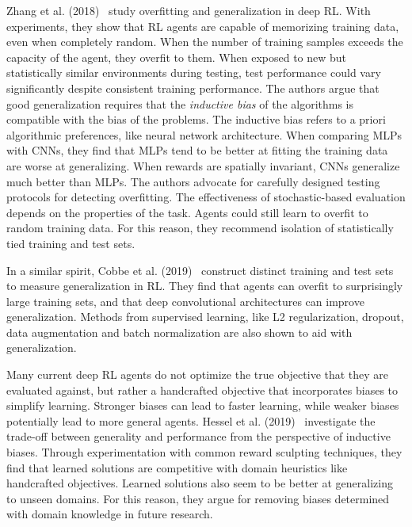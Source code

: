 Zhang et al. (2018)~\cite{zhang_overfitting_2018} study overfitting and generalization in deep RL.
With experiments, they show that RL agents are capable of memorizing training data, even when completely random.
When the number of training samples exceeds the capacity of the agent, they overfit to them.
When exposed to new but statistically similar environments during testing, test performance could vary significantly despite consistent training performance.
The authors argue that good generalization requires that the \textit{inductive bias} of the algorithms is compatible with the bias of the problems.
The inductive bias refers to a priori algorithmic preferences, like neural network architecture.
When comparing MLPs with CNNs, they find that MLPs tend to be better at fitting the training data are worse at generalizing.
When rewards are spatially invariant, CNNs generalize much better than MLPs.
The authors advocate for carefully designed testing protocols for detecting overfitting.
The effectiveness of stochastic-based evaluation depends on the properties of the task.
Agents could still learn to overfit to random training data. 
For this reason, they recommend isolation of statistically tied training and test sets.

In a similar spirit, Cobbe et al. (2019)~\cite{cobbe_generalization_2019} construct distinct training and test sets to measure generalization in RL.
They find that agents can overfit to surprisingly large training sets, and that deep convolutional architectures can improve generalization.
Methods from supervised learning, like L2 regularization, dropout, data augmentation and batch normalization are also shown to aid with generalization.

Many current deep RL agents do not optimize the true objective that they are evaluated against,
but rather a handcrafted objective that incorporates biases to simplify learning.
Stronger biases can lead to faster learning, while weaker biases potentially lead to more general agents.
Hessel et al. (2019)~\cite{hessel_inductive_2019} investigate the trade-off between generality and performance from the perspective of inductive biases.
Through experimentation with common reward sculpting techniques, they find that learned solutions are competitive with domain heuristics like handcrafted objectives.
Learned solutions also seem to be better at generalizing to unseen domains.
For this reason, they argue for removing biases determined with domain knowledge in future research.



